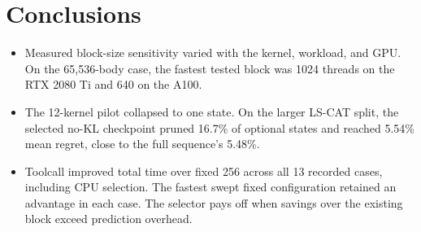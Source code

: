 \documentclass[11pt,letterpaper]{article}
\begin{document}
\section{Conclusions}

\begin{itemize}

\item Measured block-size sensitivity varied with the kernel, workload, and GPU. On the 65,536-body case, the
fastest tested block was 1024 threads on the RTX 2080 Ti and 640 on the A100.

\item The 12-kernel pilot collapsed to one state. On the larger LS-CAT split, the selected no-KL checkpoint pruned
16.7\% of optional states and reached 5.54\% mean regret, close to the full sequence's 5.48\%.

\item Toolcall improved total time over fixed 256 across all 13 recorded cases, including CPU selection. The
fastest swept fixed configuration retained an advantage in each case. The selector pays off when savings
over the existing block exceed prediction overhead.

\end{itemize}
\end{document}
